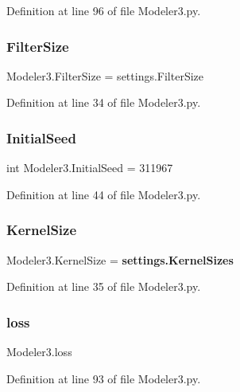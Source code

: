 Definition at line 96 of file Modeler3.\+py.

\mbox{\label{namespace_modeler3_a33bbaa3ca8c1bb4ec75e28a3d31060ae}} 
\subsubsection{Filter\+Size}
{\footnotesize\ttfamily Modeler3.\+Filter\+Size = settings.\+Filter\+Size}



Definition at line 34 of file Modeler3.\+py.

\mbox{\label{namespace_modeler3_a0980450cfc29cf3759c24147ca4969e6}} 
\subsubsection{Initial\+Seed}
{\footnotesize\ttfamily int Modeler3.\+Initial\+Seed = 311967}



Definition at line 44 of file Modeler3.\+py.

\mbox{\label{namespace_modeler3_aad4b87ca5e0d7003a432f037419c72df}} 
\subsubsection{Kernel\+Size}
{\footnotesize\ttfamily Modeler3.\+Kernel\+Size = \textbf{ settings.\+Kernel\+Sizes}}



Definition at line 35 of file Modeler3.\+py.

\mbox{\label{namespace_modeler3_a5c7d024a6f9ee67f8e81aacd874b08d0}} 
\subsubsection{loss}
{\footnotesize\ttfamily Modeler3.\+loss}



Definition at line 93 of file Modeler3.\+py.

\mbox{\label{namespace_modeler3_adc20f8b9cce32a5e72fc770d2054852c}} 
